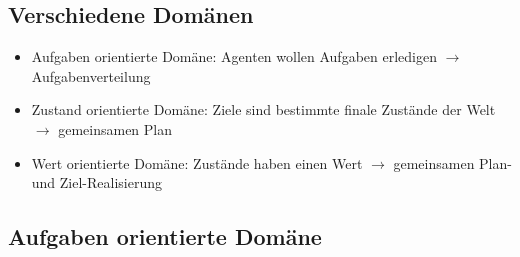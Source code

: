 \documentclass{article} %
\begin{document}
	\subsection{Verschiedene Domänen}
	\begin{itemize}
		\item Aufgaben orientierte Domäne: Agenten wollen Aufgaben erledigen $\rightarrow$ Aufgabenverteilung
		\item Zustand orientierte Domäne: Ziele sind bestimmte finale Zustände der Welt $\rightarrow$ gemeinsamen Plan
		\item Wert orientierte Domäne: Zustände haben einen Wert $\rightarrow$ gemeinsamen Plan- und Ziel-Realisierung
	\end{itemize}
	\subsection{Aufgaben orientierte Domäne}
\end{document}
